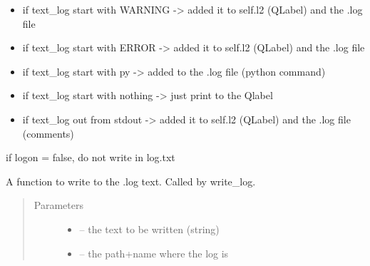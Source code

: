 \documentclass[letterpaper,10pt,english]{sphinxmanual}
\begin{document}
\begin{fulllineitems}
\begin{fulllineitems}
\begin{itemize}
\item {} 
if text\_log start with WARNING -\textgreater{} added it to self.l2 (QLabel) and the .log file

\item {} 
if text\_log start with ERROR -\textgreater{} added it to self.l2 (QLabel) and the .log file

\item {} 
if text\_log start with py -\textgreater{} added to the .log file (python command)

\item {} 
if text\_log start with nothing -\textgreater{} just print to the Qlabel

\item {} 
if text\_log out from stdout -\textgreater{} added it to self.l2 (QLabel) and the .log file (comments)

\end{itemize}

if logon = false, do not write in log.txt

\end{fulllineitems}


\begin{fulllineitems}
\label{\detokenize{index:src_GUI.Main_windows_1.CentralW.write_log_file}}
A function to write to the .log text. Called by write\_log.
\begin{quote}\begin{description}
\item[{Parameters}] \leavevmode\begin{itemize}
\item {} 
 -- the text to be written (string)

\item {} 
 -- the path+name where the log is

\end{itemize}

\end{description}\end{quote}

\end{fulllineitems}


\end{fulllineitems}
\end{document}
